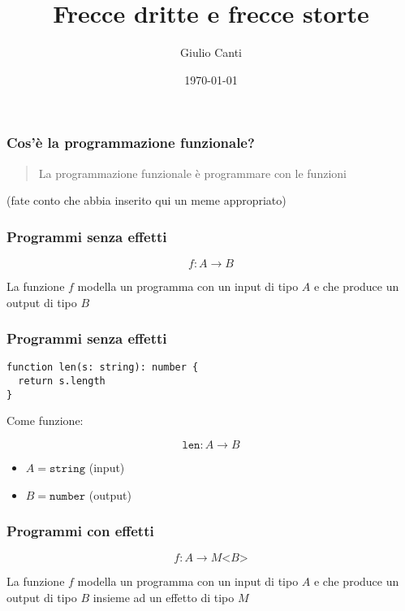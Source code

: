 \documentclass{beamer}
\title{Frecce dritte e frecce storte}
\author{Giulio Canti}
\date{\today}
\begin{document}
\begin{frame}
\titlepage %
\end{frame}


\begin{frame}
\frametitle{Cos'è la programmazione funzionale?}

\begin{quote}
La programmazione funzionale è programmare con le funzioni
\end{quote}

\centerline{(fate conto che abbia inserito qui un meme appropriato)}

\end{frame}

\begin{frame}[fragile]
\frametitle{Programmi senza effetti}

$$
f: A \rightarrow B
$$

La funzione $f$ modella un programma con un input di tipo $A$ e che produce un output di tipo $B$

\end{frame}

\begin{frame}[fragile]
\frametitle{Programmi senza effetti}

\begin{example}
\begin{verbatim}
function len(s: string): number {
  return s.length
}
\end{verbatim}
\end{example}

Come funzione:

$$
\texttt{len}: A \rightarrow B
$$

\begin{itemize}
  \item $A = \texttt{string}$ (input)
  \item $B = \texttt{number}$ (output)
\end{itemize}

\end{frame}

\begin{frame}
\frametitle{Programmi con effetti}

$$
f: A \rightarrow M \texttt{<} B \texttt{>}
$$

La funzione $f$ modella un programma con un input di tipo $A$ e che produce un output di tipo $B$ insieme ad un effetto di tipo $M$

\end{frame}
\end{document}

